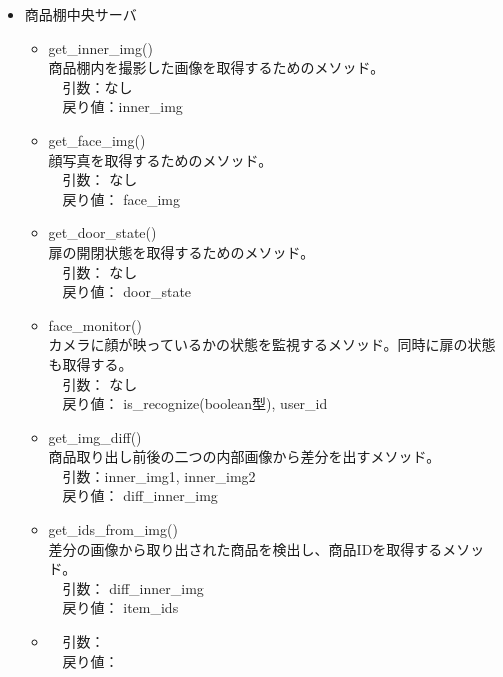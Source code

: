 \documentclass[a4, dvipdfmx, uplatex]{jsarticle}
\begin{document}
\begin{itemize}
\begin{itemize}
\end{itemize}

\item 商品棚中央サーバ \\

\begin{itemize}
\item get\_inner\_img() \\
商品棚内を撮影した画像を取得するためのメソッド。 \\
　引数：なし \\
　戻り値：inner\_img \\

\item get\_face\_img() \\
顔写真を取得するためのメソッド。 \\
　引数： なし \\
　戻り値： face\_img\\

\item get\_door\_state() \\
扉の開閉状態を取得するためのメソッド。\\
　引数： なし \\
　戻り値： door\_state \\

\item face\_monitor() \\
カメラに顔が映っているかの状態を監視するメソッド。同時に扉の状態も取得する。 \\
　引数： なし \\
　戻り値： is\_recognize(boolean型), user\_id \\

\item get\_img\_diff() \\
商品取り出し前後の二つの内部画像から差分を出すメソッド。 \\
　引数：inner\_img1, inner\_img2 \\
　戻り値： diff\_inner\_img \\

\item get\_ids\_from\_img() \\
差分の画像から取り出された商品を検出し、商品IDを取得するメソッド。 \\
　引数： diff\_inner\_img \\
　戻り値： item\_ids \\

\item
　引数： \\
　戻り値： \\


\end{itemize}
\end{itemize}
\end{document}
